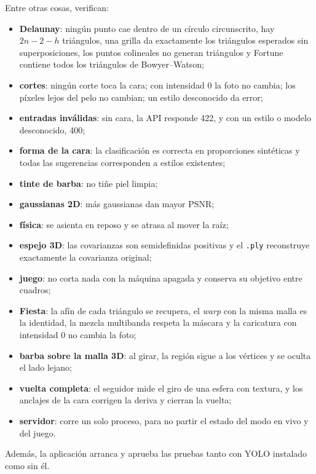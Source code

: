Entre otras cosas, verifican:
\begin{itemize}
  \item \textbf{Delaunay}: ningún punto cae dentro de un círculo circunscrito, hay $2n-2-h$ triángulos, una grilla da exactamente los triángulos esperados sin superposiciones, los puntos colineales no generan triángulos y Fortune contiene todos los triángulos de Bowyer--Watson;
  \item \textbf{cortes}: ningún corte toca la cara; con intensidad 0 la foto no cambia; los píxeles lejos del pelo no cambian; un estilo desconocido da error;
  \item \textbf{entradas inválidas}: sin cara, la API responde 422, y con un estilo o modelo desconocido, 400;
  \item \textbf{forma de la cara}: la clasificación es correcta en proporciones sintéticas y todas las sugerencias corresponden a estilos existentes;
  \item \textbf{tinte de barba}: no tiñe piel limpia;
  \item \textbf{gaussianas 2D}: más gaussianas dan mayor PSNR;
  \item \textbf{física}: se asienta en reposo y se atrasa al mover la raíz;
  \item \textbf{espejo 3D}: las covarianzas son semidefinidas positivas y el \texttt{.ply} reconstruye exactamente la covarianza original;
  \item \textbf{juego}: no corta nada con la máquina apagada y conserva su objetivo entre cuadros;
  \item \textbf{Fiesta}: la afín de cada triángulo se recupera, el \emph{warp} con la misma malla es la identidad, la mezcla multibanda respeta la máscara y la caricatura con intensidad 0 no cambia la foto;
  \item \textbf{barba sobre la malla 3D}: al girar, la región sigue a los vértices y se oculta el lado lejano;
  \item \textbf{vuelta completa}: el seguidor mide el giro de una esfera con textura, y los anclajes de la cara corrigen la deriva y cierran la vuelta;
  \item \textbf{servidor}: corre un solo proceso, para no partir el estado del modo en vivo y del juego.
\end{itemize}
Además, la aplicación arranca y aprueba las pruebas tanto con YOLO instalado como sin él.
